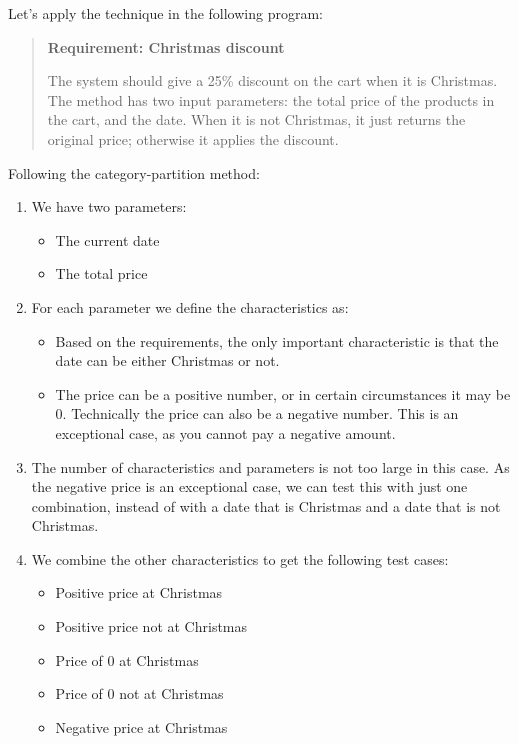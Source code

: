 Let's apply the technique in the following program:

\begin{quote}
\textbf{Requirement: Christmas discount}

The system should give a 25\% discount on the cart when it is Christmas.
The method has two input parameters: the total price of the products in
the cart, and the date. When it is not Christmas, it just returns the
original price; otherwise it applies the discount.
\end{quote}

Following the category-partition method:

\begin{enumerate}
\def\labelenumi{\arabic{enumi}.}
\item
  We have two parameters:

  \begin{itemize}
  \tightlist
  \item
    The current date
  \item
    The total price
  \end{itemize}
\item
  For each parameter we define the characteristics as:

  \begin{itemize}
  \tightlist
  \item
    Based on the requirements, the only important characteristic is that
    the date can be either Christmas or not.
  \item
    The price can be a positive number, or in certain circumstances it
    may be 0. Technically the price can also be a negative number. This
    is an exceptional case, as you cannot pay a negative amount.
  \end{itemize}
\item
  The number of characteristics and parameters is not too large in this
  case. As the negative price is an exceptional case, we can test this
  with just one combination, instead of with a date that is Christmas
  and a date that is not Christmas.
\item
  We combine the other characteristics to get the following test cases:

  \begin{itemize}
  \tightlist
  \item
    Positive price at Christmas
  \item
    Positive price not at Christmas
  \item
    Price of 0 at Christmas
  \item
    Price of 0 not at Christmas
  \item
    Negative price at Christmas
  \end{itemize}
\end{enumerate}

